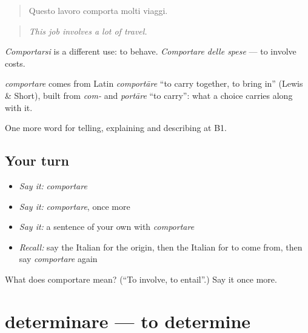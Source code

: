 \begin{quote}
Questo lavoro comporta molti viaggi.
\end{quote}

\begin{quote}
\emph{This job involves a lot of travel.}
\end{quote}

\emph{Comportarsi} is a different use: to behave. \emph{Comportare delle spese} — to involve costs.

\begin{cousinweb}
\emph{comportare} comes from Latin \emph{comportāre} \textquotedblleft{}to carry together, to bring in\textquotedblright{} (Lewis \& Short), built from \emph{com-} and \emph{portāre} \textquotedblleft{}to carry\textquotedblright{}: what a choice carries along with it.
\end{cousinweb}

\begin{grammarlens}[title={What you've built}]
One more word for telling, explaining and describing at B1.
\end{grammarlens}

\subsection*{Your turn}
\begin{itemize}
\raggedright
  \item \emph{Say it:} \emph{comportare}
  \item \emph{Say it:} \emph{comportare}, once more
  \item \emph{Say it:} a sentence of your own with \emph{comportare}
  \item \emph{Recall:} say the Italian for the origin, then the Italian for to come from, then say \emph{comportare} again
\end{itemize}

\begin{tcolorbox}[breakable,colback=teal!4,colframe=teal!35!black,title={Before you move on}]
What does comportare mean? (\textquotedblleft{}To involve, to entail\textquotedblright{}.) Say it once more.
\end{tcolorbox}
\section[determinare]{determinare — to determine}

\label{lesson:IT-C351-determinare}



